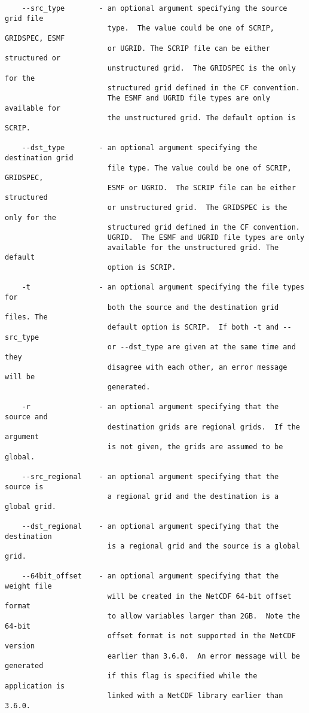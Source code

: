 \begin{verbatim}
    --src_type        - an optional argument specifying the source grid file
                        type.  The value could be one of SCRIP, GRIDSPEC, ESMF
                        or UGRID. The SCRIP file can be either structured or
                        unstructured grid.  The GRIDSPEC is the only for the
                        structured grid defined in the CF convention.
                        The ESMF and UGRID file types are only available for
                        the unstructured grid. The default option is SCRIP.

    --dst_type        - an optional argument specifying the destination grid
                        file type. The value could be one of SCRIP, GRIDSPEC,
                        ESMF or UGRID.  The SCRIP file can be either structured
                        or unstructured grid.  The GRIDSPEC is the only for the
                        structured grid defined in the CF convention.
                        UGRID.  The ESMF and UGRID file types are only
                        available for the unstructured grid. The default
                        option is SCRIP.

    -t                - an optional argument specifying the file types for
                        both the source and the destination grid files. The
                        default option is SCRIP.  If both -t and --src_type
                        or --dst_type are given at the same time and they
                        disagree with each other, an error message will be
                        generated.

    -r                - an optional argument specifying that the source and
                        destination grids are regional grids.  If the argument
                        is not given, the grids are assumed to be global.

    --src_regional    - an optional argument specifying that the source is
                        a regional grid and the destination is a global grid.

    --dst_regional    - an optional argument specifying that the destination
                        is a regional grid and the source is a global grid.

    --64bit_offset    - an optional argument specifying that the weight file
                        will be created in the NetCDF 64-bit offset format
                        to allow variables larger than 2GB.  Note the 64-bit
                        offset format is not supported in the NetCDF version
                        earlier than 3.6.0.  An error message will be generated
                        if this flag is specified while the application is
                        linked with a NetCDF library earlier than 3.6.0.


\end{verbatim}
